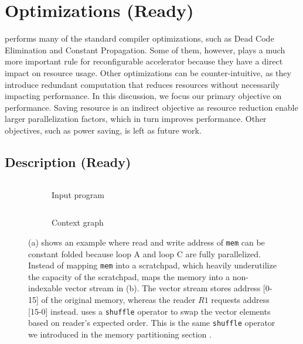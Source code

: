 \section{Optimizations (Ready)}\label{sec:opt}
\name performs many of the standard compiler optimizations,
such as Dead Code Elimination and Constant Propagation.
Some of them, however, plays a much more important rule for reconfigurable accelerator because they
have a direct impact on resource usage.
Other optimizations can be counter-intuitive, as they introduce redundant computation that
reduces resources without necessarily impacting performance.
In this discussion, we focus our primary objective on performance.
Saving resource is an indirect objective as resource reduction enable larger parallelization factors,
which in turn improves performance.
Other objectives, such as power saving, is left as future work.

\subsection{Description (Ready)}\label{sec:des}

\begin{figure}
\centering
\begin{subfigure}[b]{0.4\textwidth}
\inputminted{python}{code/msr.py}
\caption{Input program}
\end{subfigure}
\hfill
\begin{subfigure}[b]{0.5\textwidth}
\inputminted{python}{code/msrctx.py}
\caption{Context graph}
\end{subfigure}
\caption[Memory strength reduction]{
  (a) shows an example where read and write address of \texttt{mem} can be constant folded because
  loop A and loop C are fully parallelized.
  Instead of mapping \texttt{mem} into a scratchpad, which heavily underutilize the capacity of the 
  scratchpad, \name maps the memory into a non-indexable vector stream in (b). The vector stream
  stores address [0-15] of the original memory, whereas the reader $R1$ requests address [15-0] instead.
  \name uses a \texttt{shuffle} operator to swap the vector elements based on reader's expected order.
  This is the same \texttt{shuffle} operator we introduced in the memory partitioning section
  . 
}
\label{fig:msr}
\end{figure}

